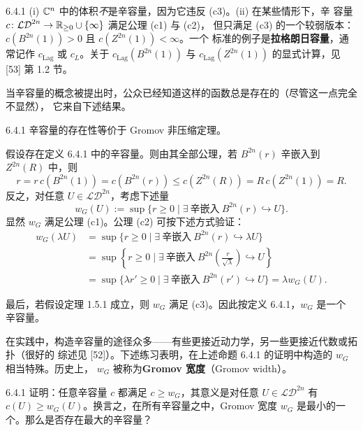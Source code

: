 \begin{wrem}{6.4.1}
  (i) $\mathbb{C}^n$ 中的体积\emph{不}是辛容量，因为它违反 (c3)。(ii) 在某些情形下，辛
  容量 $c\colon\mathcal{LD}^{2n}\to\mathbb{R}_{\ge0}\cup\{\infty\}$ 满足公理 (c1) 与 (c2)，
  但只满足 (c3) 的一个较弱版本：$c(B^{2n}(1))>0$ 且 $c(Z^{2n}(1))<\infty$。一个
  标准的例子是\textbf{拉格朗日容量}，通常记作 $c_{\mathrm{Lag}}$ 或 $c_L$。关于
  $c_{\mathrm{Lag}}(B^{2n}(1))$ 与 $c_{\mathrm{Lag}}(Z^{2n}(1))$ 的显式计算，见
  [53] 第 1.2 节。
\end{wrem}

当辛容量的概念被提出时，公众已经知道这样的函数总是存在的（尽管这一点完全不显然），
它来自下述结果。

\begin{wprop}{6.4.1}
  辛容量的存在性等价于 Gromov 非压缩定理。
\end{wprop}

\begin{wproof}
  假设存在定义 6.4.1 中的辛容量。则由其全部公理，若 $B^{2n}(r)$ 辛嵌入到
  $Z^{2n}(R)$ 中，则
  \[
    r=r\,c(B^{2n}(1))=c(B^{2n}(r))\le c(Z^{2n}(R))=R\,c(Z^{2n}(1))=R.
  \]
  反之，对任意 $U\in\mathcal{LD}^{2n}$，考虑下述量
  \begin{equation}\tag{6.24}
    w_G(U):=\sup\{r\ge0\mid
    \exists\ \text{辛嵌入}\ B^{2n}(r)\hookrightarrow U\}.
  \end{equation}
  显然 $w_G$ 满足公理 (c1)。公理 (c2) 可按下述方式验证：
  \begin{align*}
    w_G(\lambda U)
    &=\sup\{r\ge0\mid\exists\ \text{辛嵌入}\ B^{2n}(r)\hookrightarrow\lambda U\}\\
    &=\sup\left\{r\ge0\mid\exists\ \text{辛嵌入}\ 
      B^{2n}\left(\frac{r}{\sqrt{\lambda}}\right)\hookrightarrow U\right\}\\
    &=\sup\{\lambda r'\ge0\mid\exists\ \text{辛嵌入}\ 
      B^{2n}(r')\hookrightarrow U\}
      =\lambda w_G(U).
  \end{align*}
\end{wproof}

最后，若假设定理 1.5.1 成立，则 $w_G$ 满足 (c3)。因此按定义 6.4.1，$w_G$ 是一个
辛容量。

在实践中，构造辛容量的途径众多——有些更接近动力学，另一些更接近代数或拓扑（很好的
综述见 [52]）。下述练习表明，在上述命题 6.4.1 的证明中构造的 $w_G$ 相当特殊。历史上，
$w_G$ 被称为\textbf{Gromov 宽度}（Gromov width）。

\begin{wexer}{6.4.1}
  证明：任意辛容量 $c$ 都满足 $c\ge w_G$，其意义是对任意
  $U\in\mathcal{LD}^{2n}$ 有 $c(U)\ge w_G(U)$。换言之，在所有辛容量之中，Gromov
  宽度 $w_G$ 是最小的一个。那么是否存在最大的辛容量？
\end{wexer}

